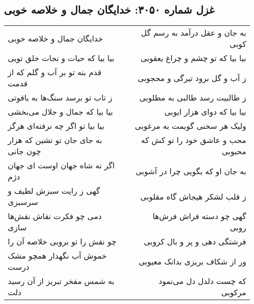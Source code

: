 \begin{center}
\section*{غزل شماره ۳۰۵۰: خدایگان جمال و خلاصه خوبی}
\label{sec:3050}
\begin{longtable}{l p{0.5cm} r}
خدایگان جمال و خلاصه خوبی
&&
به جان و عقل درآمد به رسم گل کوبی
\\
بیا بیا که حیات و نجات خلق تویی
&&
بیا بیا که تو چشم و چراغ یعقوبی
\\
قدم بنه تو بر آب و گلم که از قدمت
&&
ز آب و گل برود تیرگی و محجوبی
\\
ز تاب تو برسد سنگ‌ها به یاقوتی
&&
ز طالبیت رسد طالبی به مطلوبی
\\
بیا بیا که جمال و جلال می‌بخشی
&&
بیا بیا که دوای هزار ایوبی
\\
بیا بیا تو اگر چه نرفته‌ای هرگز
&&
ولیک هر سخنی گویمت به مرغوبی
\\
به جای جان تو نشین که هزار چون جانی
&&
محب و عاشق خود را تو کش که محبوبی
\\
اگر نه شاه جهان اوست ای جهان دژم
&&
به جان او که بگویی چرا در آشوبی
\\
گهی ز رایت سبزش لطیف و سرسبزی
&&
ز قلب لشکر هیجاش گاه مقلوبی
\\
دمی چو فکرت نقاش نقش‌ها سازی
&&
گهی چو دسته فراش فرش‌ها روبی
\\
چو نقش را تو بروبی خلاصه آن را
&&
فرشتگی دهی و پر و بال کروبی
\\
خموش آب نگهدار همچو مشک درست
&&
ور از شکاف بریزی بدانک معیوبی
\\
به شمس مفخر تبریز از آن رسید دلت
&&
که چست دلدل دل می‌نمود مرکوبی
\\
\end{longtable}
\end{center}
